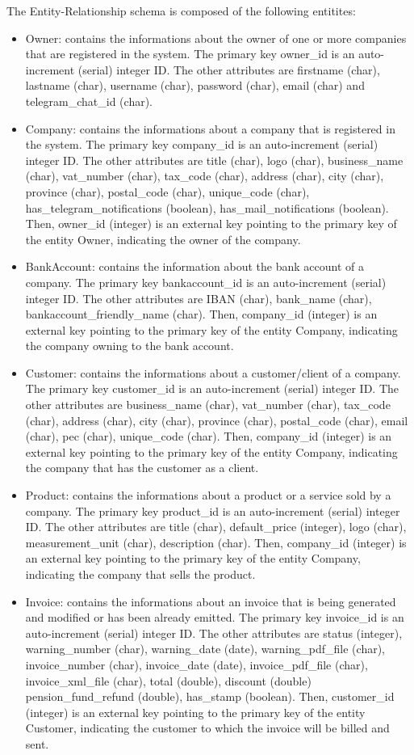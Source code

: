 The Entity-Relationship schema is composed of the following entitites:
\begin{itemize}
 	\item Owner: contains the informations about the owner of one or more companies that are registered in the system. The primary key owner\_id is an auto-increment (serial) integer ID. The other attributes are firstname (char), lastname (char), username (char), password (char), email (char) and telegram\_chat\_id (char).
	\item Company: contains the informations about a company that is registered in the system. The primary key company\_id is an auto-increment (serial) integer ID. The other attributes are title (char), logo (char), business\_name (char), vat\_number (char), tax\_code (char), address (char), city (char), province (char), postal\_code (char), unique\_code (char), has\_telegram\_notifications (boolean), has\_mail\_notifications (boolean). Then, owner\_id (integer) is an external key pointing to the primary key of the entity Owner, indicating the owner of the company.
	\item BankAccount: contains the information about the bank account of a company. The primary key bankaccount\_id is an auto-increment (serial) integer ID. The other attributes are IBAN (char), bank\_name (char), bankaccount\_friendly\_name (char). Then, company\_id (integer) is an external key pointing to the primary key of the entity Company, indicating the company owning to the bank account.
   	\item Customer: contains the informations about a customer/client of a company. The primary key customer\_id is an auto-increment (serial) integer ID. The other attributes are business\_name (char), vat\_number (char), tax\_code (char), address (char), city (char), province (char), postal\_code (char), email (char), pec (char), unique\_code (char). Then, company\_id (integer) is an external key pointing to the primary key of the entity Company, indicating the company that has the customer as a client.
   	\item Product: contains the informations about a product or a service sold by a company. The primary key product\_id is an auto-increment (serial) integer ID. The other attributes are title (char), default\_price (integer), logo (char), measurement\_unit (char), description (char). Then, company\_id (integer) is an external key pointing to the primary key of the entity Company, indicating the company that sells the product.
	\item Invoice: contains the informations about an invoice that is being generated and modified or has been already emitted. The primary key invoice\_id is an auto-increment (serial) integer ID. The other attributes are status (integer), warning\_number (char), warning\_date (date), warning\_pdf\_file (char), invoice\_number (char), invoice\_date (date), invoice\_pdf\_file (char), invoice\_xml\_file (char), total (double), discount (double) pension\_fund\_refund (double), has\_stamp (boolean). Then, customer\_id (integer) is an external key pointing to the primary key of the entity Customer, indicating the customer to which the invoice will be billed and sent.

\end{itemize}
